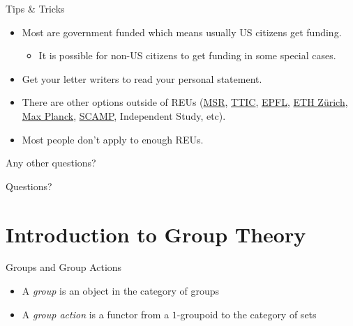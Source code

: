 \documentclass[aspectratio=169]{beamer}
\begin{document}
\begin{frame}{Tips \& Tricks}
    \begin{itemize}
        \item Most are government funded which means usually US citizens get funding.
        \begin{itemize}
            \item It is possible for non-US citizens to get funding in some special cases.
        \end{itemize} \pause
        \item Get your letter writers to read your personal statement.
        \item There are other options outside of REUs (\href{https://www.microsoft.com/en-us/research/}{MSR}, \href{https://www.ttic.edu/}{TTIC}, \href{https://summer.epfl.ch/}{EPFL}, \href{https://inf.ethz.ch/studies/summer-research-fellowship.html}{ETH Z{\"u}rich}, \href{https://www.cis.mpg.de/internships/}{Max Planck}, \href{https://idaccr.org/scamp}{SCAMP}, Independent Study, etc).
        \item Most people don't apply to enough REUs.
    \end{itemize} \pause
    \textcolor{sigma@alertred}{Any other questions?}
\end{frame}

\begin{frame}{}
      \begin{center}
    {\color{sigma@mainblue} \LARGE Questions?}
  \end{center}
\end{frame}

\section{Introduction to Group Theory}
\frame{\sectionpage}

\begin{frame}{Groups and Group Actions}
    \begin{itemize}
        \item A \emph{group} is an object in the category of groups
        \item A \emph{group action} is a functor from a $1$-groupoid to the category of sets
    \end{itemize}
\end{frame}
\end{document}
